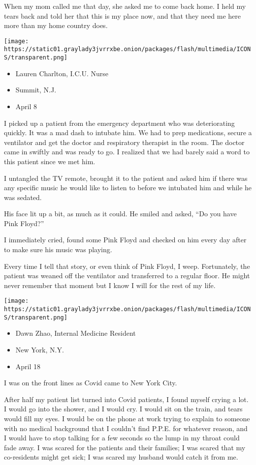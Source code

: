 When my mom called me that day, she asked me to come back home. I held
my tears back and told her that this is my place now, and that they need
me here more than my home country does.

\texttt{[image: https://static01.graylady3jvrrxbe.onion/packages/flash/multimedia/ICONS/transparent.png]}

\begin{itemize}
\tightlist
\item
  Lauren Charlton, I.C.U. Nurse
\item
  Summit, N.J.
\item
  April 8
\end{itemize}

I picked up a patient from the emergency department who was
deteriorating quickly. It was a mad dash to intubate him. We had to prep
medications, secure a ventilator and get the doctor and respiratory
therapist in the room. The doctor came in swiftly and was ready to go. I
realized that we had barely said a word to this patient since we met
him.

I untangled the TV remote, brought it to the patient and asked him if
there was any specific music he would like to listen to before we
intubated him and while he was sedated.

His face lit up a bit, as much as it could. He smiled and asked, ``Do
you have Pink Floyd?''

I immediately cried, found some Pink Floyd and checked on him every day
after to make sure his music was playing.

Every time I tell that story, or even think of Pink Floyd, I weep.
Fortunately, the patient was weaned off the ventilator and transferred
to a regular floor. He might never remember that moment but I know I
will for the rest of my life.

\texttt{[image: https://static01.graylady3jvrrxbe.onion/packages/flash/multimedia/ICONS/transparent.png]}

\begin{itemize}
\tightlist
\item
  Dawn Zhao, Internal Medicine Resident
\item
  New York, N.Y.
\item
  April 18
\end{itemize}

I was on the front lines as Covid came to New York City.

After half my patient list turned into Covid patients, I found myself
crying a lot. I would go into the shower, and I would cry. I would sit
on the train, and tears would fill my eyes. I would be on the phone at
work trying to explain to someone with no medical background that I
couldn't find P.P.E. for whatever reason, and I would have to stop
talking for a few seconds so the lump in my throat could fade away. I
was scared for the patients and their families; I was scared that my
co-residents might get sick; I was scared my husband would catch it from
me.

